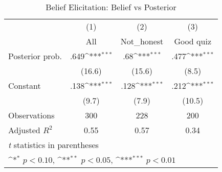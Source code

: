\begin{table}[htbp]\centering
\def\sym#1{\ifmmode^{#1}\else\(^{#1}\)\fi}
\caption{Belief Elicitation: Belief vs Posterior}
\begin{tabular}{l*{3}{c}}
\hline\hline
                &\multicolumn{1}{c}{(1)}&\multicolumn{1}{c}{(2)}&\multicolumn{1}{c}{(3)}\\
                &\multicolumn{1}{c}{All}&\multicolumn{1}{c}{Not\_honest}&\multicolumn{1}{c}{Good quiz}\\
\hline
Posterior prob. &     .649\sym{***}&      .68\sym{***}&     .477\sym{***}\\
                &   (16.6)         &   (15.6)         &    (8.5)         \\
Constant        &     .138\sym{***}&     .128\sym{***}&     .212\sym{***}\\
                &    (9.7)         &    (7.9)         &   (10.5)         \\
\hline
Observations    &      300         &      228         &      200         \\
Adjusted \(R^{2}\)&     0.55         &     0.57         &     0.34         \\
\hline\hline
\multicolumn{4}{l}{\footnotesize \textit{t} statistics in parentheses}\\
\multicolumn{4}{l}{\footnotesize \sym{*} \(p<0.10\), \sym{**} \(p<0.05\), \sym{***} \(p<0.01\)}\\
\end{tabular}
\end{table}
